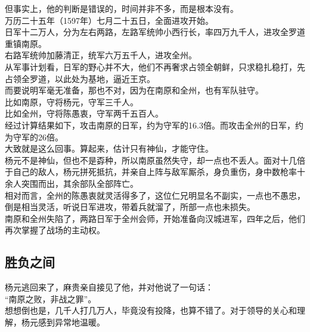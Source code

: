 \begin{multicols}{\theparacolNo}
但事实上，他的判断是错误的，时间并非不多，而是根本没有。\\

万历二十五年（1597年）七月二十五日，全面进攻开始。\\

日军十二万人，分为左右两路，左路军统帅小西行长，率四万九千人，进攻全罗道重镇南原。\\

右路军统帅加藤清正，统军六万五千人，进攻全州。\\

从军事计划看，日军的野心并不大，他们不再奢求占领全朝鲜，只求稳扎稳打，先占领全罗道，以此处为基地，逼近王京。\\

而要说明军毫无准备，那也不对，因为在南原和全州，也有军队驻守。\\

比如南原，守将杨元，守军三千人。\\

比如全州，守将陈愚衷，守军两千五百人。\\

经过计算结果如下，攻击南原的日军，约为守军的16.3倍。而攻击全州的日军，约为守军的26倍。\\

大致就是这么回事。算起来，估计只有神仙，才能守住。\\

杨元不是神仙，但也不是孬种，所以南原虽然失守，却一点也不丢人。面对十几倍于自己的敌人，杨元拼死抵抗，并亲自上阵与敌军厮杀，身负重伤，身中数枪率十余人突围而出，其余部队全部阵亡。\\

相对而言，全州的陈愚衷就灵活得多了，这位仁兄明显名不副实，一点也不愚忠，倒是相当灵活，听说日军进攻，带着兵就溜了，所部一点也未损失。\\

南原和全州失陷了，两路日军于全州会师，开始准备向汉城进军，四年之后，他们再次掌握了战场的主动权。\\

\subsection{胜负之间}
杨元逃回来了，麻贵亲自接见了他，并对他说了一句话：\\

“南原之败，非战之罪”。\\

想想倒也是，几千人打几万人，毕竟没有投降，也算不错了。对于领导的关心和理解，杨元感到异常地温暖。\\


\end{multicols}
